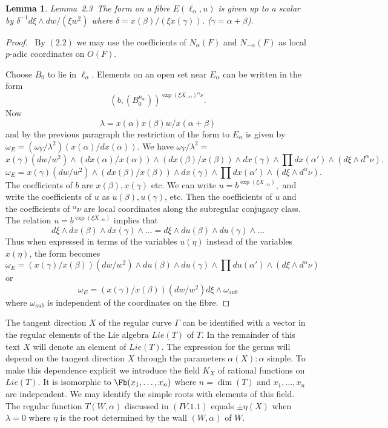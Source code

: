 \documentclass{memo-l}
\newtheorem{lemma}[theorem]{Lemma}
\theoremstyle{definition}
\theoremstyle{remark}
\numberwithin{section}{chapter}
\numberwithin{equation}{chapter}
\begin{document}
\medpagebreak

\begin{lemma}{Lemma\ 2.3}\  The form on a fibre $E({\ell}_{{\alpha}},u)$ is
given up to a scalar by ${\delta}^{-1}d{\xi}\wedge dw/({\xi}w^{2})$ where
${\delta} = x({\beta})/({\xi}x({\gamma}))$. ($\gamma=\alpha+\beta$).
\end{lemma}

\begin{proof} \ By $(2.2)$ we may use the coefficients of
$N_{{\alpha}}(F)$ and $N_{-{\alpha}}(F)$ as local $p$-adic coordinates on
$O(F)$.

   Choose $B_{0}$ to lie in ${\ell}_{{\alpha}}$.  Elements on an open set
near $E_{{\alpha}}$ can be written in the form 
$$(b,(B_{0}^{n_w}))^{\exp(\xi X_{-\alpha}){{}^\alpha\nu}}.$$   Now
$$
{\lambda}  =  x({\alpha})x({\beta})w/x({\alpha}+{\beta})
$$
and by the previous paragraph the restriction of the form to $E_{{\alpha}}$
is given by ${\omega}_{E}  = 
({\omega}_{Y}/{\lambda}^{2})(x({\alpha})/dx({\alpha}))$.  We have
${\omega}_{Y}/{\lambda}^{2}  = $
$$
x({\gamma})(dw/w^{2})\wedge (dx({\alpha})/x({\alpha}))\wedge
(dx({\beta})/x({\beta}))\wedge dx({\gamma})\wedge \prod 
dx({\alpha}')\wedge (d{\xi}\wedge d^{{\alpha}}{\nu}).
$$
$$
{\omega}_{E}  =  x({\gamma})(dw/w^{2})\wedge (dx({\beta})/x({\beta}))\wedge
dx({\gamma})\wedge \prod dx({\alpha}')\wedge (d{\xi}\wedge d^{{\alpha}}{\nu}).
$$
The coefficients of $b$ are $x({\beta}), x({\gamma})$ etc.  We can write $u
 =  b^{\exp({\xi}X_{-{\alpha}})},$ and write the coefficients of $u$ as
$u({\beta}), u({\gamma})$, etc.  Then the coefficients of $u$ and the
coefficients of $^{{\alpha}}{\nu}$ are local coordinates along the
subregular conjugacy class.  The relation $u = b^{\exp({\xi}X_{-{\alpha}})}$ 
implies that
$$
d{\xi}\wedge dx({\beta})\wedge dx({\gamma})\wedge \ldots =  d{\xi}\wedge
du({\beta})\wedge du({\gamma})\wedge \ldots
$$
Thus when expressed in terms of the variables $u({\eta})$ instead of the
variables $x({\eta})$, the form becomes
$$
{\omega}_{E}  =  (x({\gamma})/x({\beta}))(dw/w^{2})\wedge du({\beta})\wedge
du({\gamma})\wedge \prod du({\alpha}')\wedge (d{\xi}\wedge d^{{\alpha}}{\nu})
$$
or 
$$
{\omega}_{E}  =  (x({\gamma})/x({\beta}))(dw/w^{2})d{\xi}\wedge {\omega}_{sub}
$$
where ${\omega}_{sub}$ is independent of the coordinates on the fibre.
\end{proof} 
 

{\medskip}

   The tangent direction $X$ of the regular curve ${\Gamma}$ can be
identified with a vector in the regular elements of the Lie algebra
$Lie(T)$ of $T$.  In the remainder of this text  $X$ will denote an
element of $Lie(T)$.  The expression for the germs will depend on the
tangent direction $X$ through the parameters ${\alpha}(X) : {\alpha}$
simple.  To make this dependence explicit we introduce the 
field $K_X$ of rational functions on $Lie(T)$.
It is isomorphic to $\Fb (x_{1},\ldots
,x_{n})$ where $n  =  \dim(T)$ and $x_{1},\ldots ,x_{n}$ are independent.  
We may identify the simple roots with elements of this
field.  The regular function $T(W,{\alpha})$ discussed in $(IV.1.1)$ equals
${\pm}{\eta}(X)$ when ${\lambda} = 0$ where ${\eta}$ is the root
determined by the wall $(W,{\alpha})$ of $W$.
\end{document}

